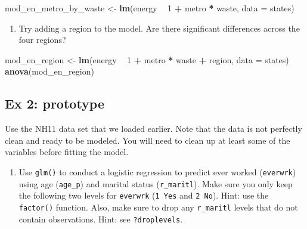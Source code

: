 \documentclass[]{book}
\newenvironment{Shaded}{\begin{snugshade}}{\end{snugshade}}
\newcommand{\DataTypeTok}[1]{\textcolor[rgb]{0.13,0.29,0.53}{#1}}
\newcommand{\DecValTok}[1]{\textcolor[rgb]{0.00,0.00,0.81}{#1}}
\newcommand{\KeywordTok}[1]{\textcolor[rgb]{0.13,0.29,0.53}{\textbf{#1}}}
\newcommand{\NormalTok}[1]{#1}
\newcommand{\OperatorTok}[1]{\textcolor[rgb]{0.81,0.36,0.00}{\textbf{#1}}}
\newcommand{\StringTok}[1]{\textcolor[rgb]{0.31,0.60,0.02}{#1}}
\providecommand{\tightlist}{%
  \setlength{\itemsep}{0pt}\setlength{\parskip}{0pt}}
\begin{document}
\begin{Shaded}
\begin{Highlighting}[]
\NormalTok{  mod_en_metro_by_waste <-}\StringTok{ }\KeywordTok{lm}\NormalTok{(energy }\OperatorTok{~}\StringTok{ }\DecValTok{1} \OperatorTok{+}\StringTok{ }\NormalTok{metro }\OperatorTok{*}\StringTok{ }\NormalTok{waste, }\DataTypeTok{data =}\NormalTok{ states)}
\end{Highlighting}
\end{Shaded}

\begin{enumerate}
\def\labelenumi{\arabic{enumi}.}
\setcounter{enumi}{1}
\tightlist
\item
  Try adding a region to the model. Are there significant differences across the four regions?
\end{enumerate}

\begin{Shaded}
\begin{Highlighting}[]
\NormalTok{  mod_en_region <-}\StringTok{ }\KeywordTok{lm}\NormalTok{(energy }\OperatorTok{~}\StringTok{ }\DecValTok{1} \OperatorTok{+}\StringTok{ }\NormalTok{metro }\OperatorTok{*}\StringTok{ }\NormalTok{waste }\OperatorTok{+}\StringTok{ }\NormalTok{region, }\DataTypeTok{data =}\NormalTok{ states)}
  \KeywordTok{anova}\NormalTok{(mod_en_region)}
\end{Highlighting}
\end{Shaded}

\hypertarget{ex-2-prototype}{%
\subsection{Ex 2: prototype}\label{ex-2-prototype}}

Use the NH11 data set that we loaded earlier. Note that the data is not perfectly clean and ready to be modeled. You will need to clean up at least some of the variables before fitting the model.

\begin{enumerate}
\def\labelenumi{\arabic{enumi}.}
\tightlist
\item
  Use \texttt{glm()} to conduct a logistic regression to predict ever worked (\texttt{everwrk}) using age (\texttt{age\_p}) and marital status (\texttt{r\_maritl}). Make sure you only keep the following two levels for \texttt{everwrk} (\texttt{1\ Yes} and \texttt{2\ No}). Hint: use the \texttt{factor()} function. Also, make sure to drop any \texttt{r\_maritl} levels that do not contain observations. Hint: see \texttt{?droplevels}.
\end{enumerate}
\end{document}
